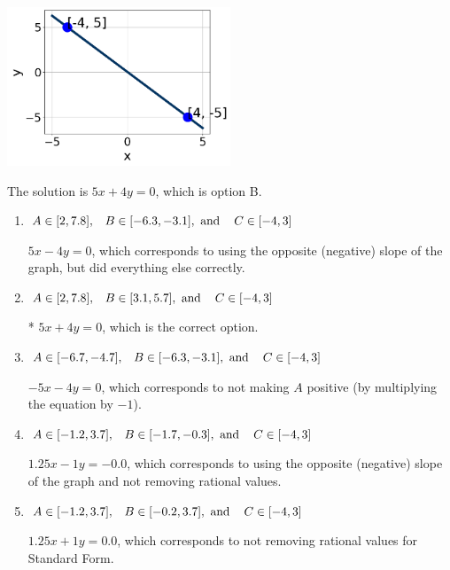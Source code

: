 \documentclass{extbook}[14pt]
\begin{document}
\begin{enumerate}
{\begin{center}
    \includegraphics[width=0.5\textwidth]{../Figures/linearGraphToStandardA.png}
\end{center}




The solution is \( 5x + 4y = 0 \), which is option B.\begin{enumerate}[label=\Alph*.]
\item \( A \in [2, 7.8], \hspace{3mm} B \in [-6.3, -3.1], \text{ and } \hspace{3mm} C \in [-4, 3] \)

 $5x - 4y = 0$, which corresponds to using the opposite (negative) slope of the graph, but did everything else correctly.
\item \( A \in [2, 7.8], \hspace{3mm} B \in [3.1, 5.7], \text{ and } \hspace{3mm} C \in [-4, 3] \)

* $5x + 4y = 0$, which is the correct option.
\item \( A \in [-6.7, -4.7], \hspace{3mm} B \in [-6.3, -3.1], \text{ and } \hspace{3mm} C \in [-4, 3] \)

 $-5x - 4y = 0$, which corresponds to not making $A$ positive (by multiplying the equation by $-1$).
\item \( A \in [-1.2, 3.7], \hspace{3mm} B \in [-1.7, -0.3], \text{ and } \hspace{3mm} C \in [-4, 3] \)

 $1.25x - 1y = -0.0$, which corresponds to using the opposite (negative) slope of the graph and not removing rational values.
\item \( A \in [-1.2, 3.7], \hspace{3mm} B \in [-0.2, 3.7], \text{ and } \hspace{3mm} C \in [-4, 3] \)

 $1.25x + 1y = 0.0$, which corresponds to not removing rational values for Standard Form.
\end{enumerate}

}
\end{enumerate}
\end{document}
